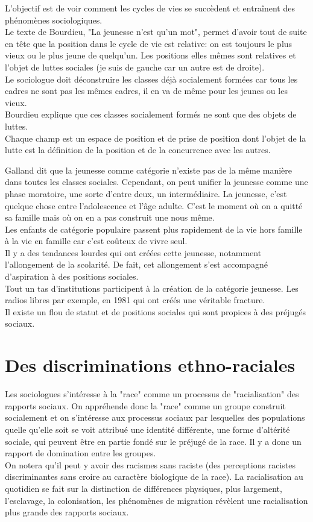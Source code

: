 \documentclass[10pt, a4paper, openany]{book}
\begin{document}
L'objectif est de voir comment les cycles de vies se succèdent et entraînent des phénomènes sociologiques. \\
Le texte de Bourdieu, "La jeunesse n'est qu'un mot", permet d'avoir tout de suite en tête que la position dans le cycle de vie est relative: on est toujours le plus vieux ou le plus jeune de quelqu'un. Les positions elles mêmes sont relatives et l'objet de luttes sociales (je suis de gauche car un autre est de droite). \\
Le sociologue doit déconstruire les classes déjà socialement formées car tous les cadres ne sont pas les mêmes cadres, il en va de même pour les jeunes ou les vieux. \\
Bourdieu explique que ces classes socialement formés ne sont que des objets de luttes. \\
Chaque champ est un espace de position et de prise de position dont l'objet de la lutte est la définition de la position et de la concurrence avec les autres.  


Galland dit que la jeunesse comme catégorie n'existe pas de la même manière dans toutes les classes sociales. Cependant, on peut unifier la jeunesse comme une phase moratoire, une sorte d'entre deux, un intermédiaire. La jeunesse, c'est quelque chose entre l'adolescence et l'âge adulte. C'est le moment où on a quitté sa famille mais où on en a pas construit une nous même. \\
Les enfants de catégorie populaire passent plus rapidement de la vie hors famille à la vie en famille car c'est coûteux de vivre seul. \\
Il y a des tendances lourdes qui ont créées cette jeunesse, notamment l'allongement de la scolarité. De fait, cet allongement s'est accompagné d'aspiration à des positions sociales. \\
Tout un tas d'institutions participent à la création de la catégorie jeunesse. Les radios libres par exemple, en 1981 qui ont créés une véritable fracture. \\
Il existe un flou de statut et de positions sociales qui sont propices à des préjugés sociaux. 



\chapter{Des discriminations ethno-raciales}

Les sociologues s'intéresse à la "race" comme un processus de "racialisation" des rapports sociaux. On appréhende donc la "race" comme un groupe construit socialement et on s'intéresse aux processus sociaux par lesquelles des populations quelle qu'elle soit se voit attribué une identité différente, une forme d'altérité sociale, qui peuvent être en partie fondé sur le préjugé de la race. Il y a donc un rapport de domination entre les groupes. \\
On notera qu'il peut y avoir des racismes sans raciste (des perceptions racistes discriminantes sans croire au caractère biologique de la race). La racialisation au quotidien se fait sur la distinction de différences physiques, plus largement, l'esclavage, la colonisation, les phénomènes de migration révèlent une racialisation plus grande des rapports sociaux. 
\end{document}
